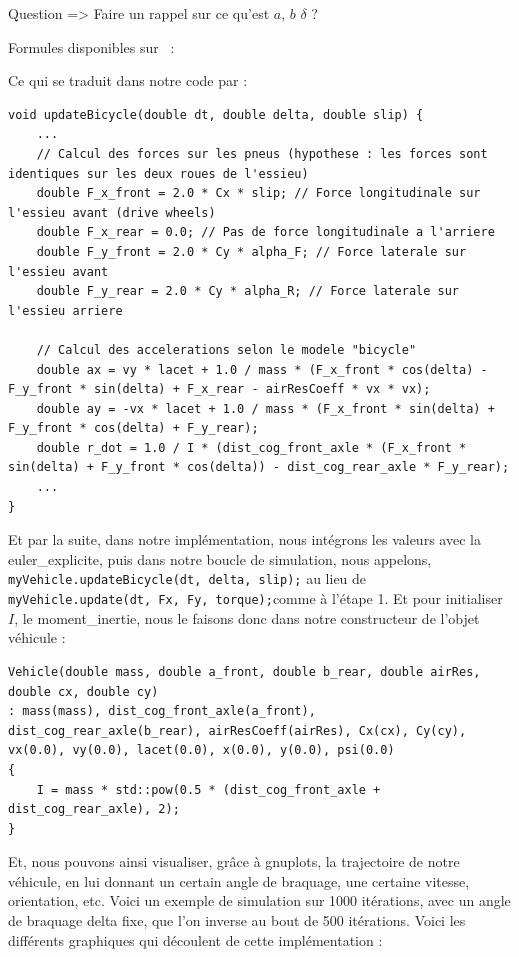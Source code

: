 {\Large Question => Faire un rappel sur ce qu'est $a$, $b$ $\delta$ ?}
\begin{center}
Formules disponibles sur ~\cite{VDS_MathWorks}:
\end{center}


Ce qui se traduit dans notre code par :

\begin{lstlisting}[style=CStyle,label={lst:update_bicycle}]
void updateBicycle(double dt, double delta, double slip) {
    ...
    // Calcul des forces sur les pneus (hypothese : les forces sont identiques sur les deux roues de l'essieu)
    double F_x_front = 2.0 * Cx * slip; // Force longitudinale sur l'essieu avant (drive wheels)
    double F_x_rear = 0.0; // Pas de force longitudinale a l'arriere
    double F_y_front = 2.0 * Cy * alpha_F; // Force laterale sur l'essieu avant
    double F_y_rear = 2.0 * Cy * alpha_R; // Force laterale sur l'essieu arriere

    // Calcul des accelerations selon le modele "bicycle"
    double ax = vy * lacet + 1.0 / mass * (F_x_front * cos(delta) - F_y_front * sin(delta) + F_x_rear - airResCoeff * vx * vx);
    double ay = -vx * lacet + 1.0 / mass * (F_x_front * sin(delta) + F_y_front * cos(delta) + F_y_rear);
    double r_dot = 1.0 / I * (dist_cog_front_axle * (F_x_front * sin(delta) + F_y_front * cos(delta)) - dist_cog_rear_axle * F_y_rear);
    ...
}
\end{lstlisting}

Et par la suite, dans notre implémentation, nous intégrons les valeurs avec la \gls{euler_explicite}, puis dans notre boucle de simulation, nous appelons, \texttt{myVehicle.updateBicycle(dt, delta, slip);} au lieu de \texttt{myVehicle.update(dt, Fx, Fy, torque);}comme à l'étape 1.
Et pour initialiser $I$, le \gls{moment_inertie}, nous le faisons donc dans notre constructeur de l'objet véhicule :

\begin{lstlisting}[style=CStyle,label={lst:constructor_vehicle_1}]
Vehicle(double mass, double a_front, double b_rear, double airRes, double cx, double cy)
: mass(mass), dist_cog_front_axle(a_front), dist_cog_rear_axle(b_rear), airResCoeff(airRes), Cx(cx), Cy(cy), vx(0.0), vy(0.0), lacet(0.0), x(0.0), y(0.0), psi(0.0)
{
    I = mass * std::pow(0.5 * (dist_cog_front_axle + dist_cog_rear_axle), 2);
}
\end{lstlisting}

Et, nous pouvons ainsi visualiser, grâce à \glspl{gnuplot}, la trajectoire de notre véhicule, en lui donnant un certain angle de braquage, une certaine vitesse, orientation, etc.
Voici un exemple de simulation sur 1000 itérations, avec un angle de braquage delta fixe, que l'on inverse au bout de 500 itérations.
Voici les différents graphiques qui découlent de cette implémentation :

